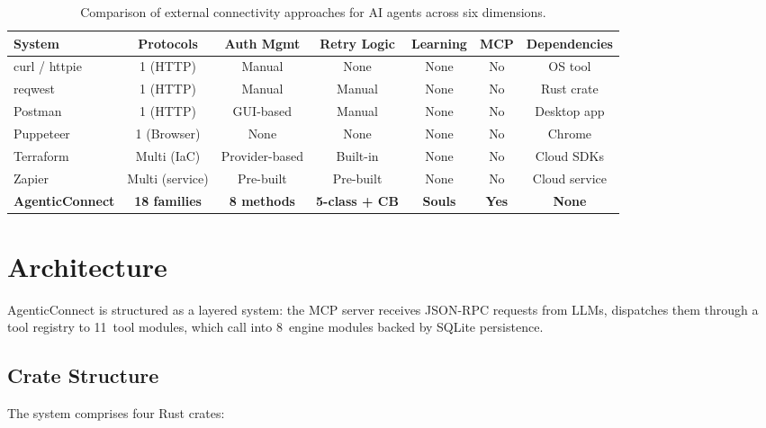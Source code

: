 \documentclass[10pt, twocolumn]{article}
\begin{document}
\begin{table}[t]
\caption{Comparison of external connectivity approaches for AI agents across six dimensions.}
\label{tab:related}
\centering
\small
\begin{tabular}{@{}lcccccc@{}}
\toprule
\textbf{System} & \textbf{Protocols} & \textbf{Auth Mgmt} & \textbf{Retry Logic} & \textbf{Learning} & \textbf{MCP} & \textbf{Dependencies} \\
\midrule
curl / httpie & 1 (HTTP) & Manual & None & None & No & OS tool \\
reqwest~\cite{reqwest2024} & 1 (HTTP) & Manual & Manual & None & No & Rust crate \\
Postman~\cite{postman2024} & 1 (HTTP) & GUI-based & Manual & None & No & Desktop app \\
Puppeteer~\cite{puppeteer2024} & 1 (Browser) & None & None & None & No & Chrome \\
Terraform~\cite{terraform2024} & Multi (IaC) & Provider-based & Built-in & None & No & Cloud SDKs \\
Zapier~\cite{zapier2024} & Multi (service) & Pre-built & Pre-built & None & No & Cloud service \\
\midrule
\textbf{AgenticConnect} & \textbf{18 families} & \textbf{8 methods} & \textbf{5-class + CB} & \textbf{Souls} & \textbf{Yes} & \textbf{None} \\
\bottomrule
\end{tabular}
\end{table}

\section{Architecture}
\label{sec:architecture}

AgenticConnect is structured as a layered system: the MCP server receives JSON-RPC requests from LLMs, dispatches them through a tool registry to 11~tool modules, which call into 8~engine modules backed by SQLite persistence.

\subsection{Crate Structure}

The system comprises four Rust crates:
\end{document}
